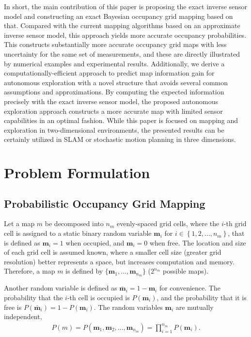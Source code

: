 \documentclass[smallextended]{svjour3}       %
\newcommand{\braces}[1]{\ensuremath{\left\{ #1 \right\}}}
\begin{document}
In short, the main contribution of this paper is proposing the exact inverse sensor model and constructing an exact Bayesian occupancy grid mapping based on that. Compared with the current mapping algorithms based on an approximate inverse sensor model, this approach yields more accurate occupancy probabilities. This constructs substantially more accurate occupancy grid maps with less uncertainty for the same set of measurements, and these are directly illustrated by numerical examples and experimental results. Additionally, we derive a computationally-efficient approach to predict map information gain for autonomous exploration with a novel structure that avoids several common assumptions and approximations. By computing the expected information precisely with the exact inverse sensor model, the proposed autonomous exploration approach constructs a more accurate map with limited sensor capabilities in an optimal fashion. While this paper is focused on mapping and exploration in two-dimensional environments, the presented results can be certainly utilized in SLAM or stochastic motion planning in three dimensions.









\section{Problem Formulation}
\label{sec:ProbForm}

\subsection{Probabilistic Occupancy Grid Mapping}
\label{subsec:POGM}
Let a map $m$ be decomposed into $n_m$ evenly-spaced grid cells, where the $i$-th grid cell is assigned to a static binary random variable $\mathbf{m}_i$ for $i\in\braces{1,2,\ldots,n_m}$, that is defined as $\mathbf{m}_i=1$ when occupied, and $\mathbf{m}_i=0$ when free. The location and size of each grid cell is assumed known, where a smaller cell size (greater grid resolution) better represents a space, but increases computation and memory. Therefore, a map $m$ is defined by $\{\mathbf{m}_1,\ldots, \mathbf{m}_{n_m}\}$ ($2^{n_{m}}$ possible maps).

Another random variable is defined as $\bar{\mathbf{m}}_i=1-\mathbf{m}_i$ for convenience. The probability that the $i$-th cell is occupied is $P(\mathbf{m}_i)$, and the probability that it is free is $P(\bar{\mathbf{m}}_i)=1-P(\mathbf{m}_i)$. The random variables $\mathbf{m}_i$ are mutually independent, 
\begin{align}
P(m)=P(\mathbf{m}_1,\mathbf{m}_2,\ldots,\mathbf{m}_{n_m})=\prod_{i=1}^{n_m}P(\mathbf{m}_i).
\end{align}
\end{document}
